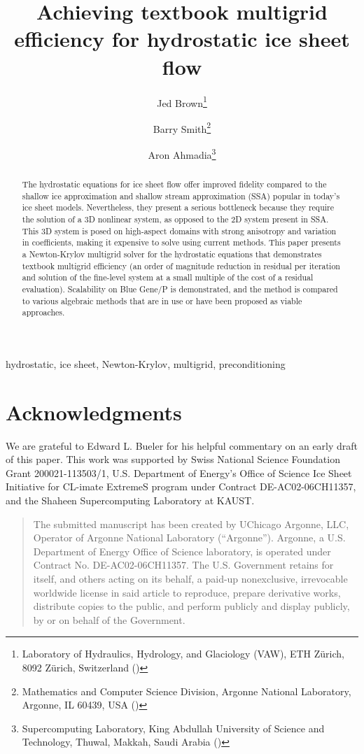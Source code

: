 \documentclass[final]{siamltex}
\title{Achieving textbook multigrid efficiency for hydrostatic ice sheet flow}
\author{%
  {Jed Brown}\thanks{Laboratory of Hydraulics, Hydrology, and Glaciology (VAW), ETH Z\"urich, 8092 Z\"urich, Switzerland (\email{brown@vaw.baug.ethz.ch})}
  \and {Barry Smith}\thanks{Mathematics and Computer Science Division, Argonne National Laboratory, Argonne, IL 60439, USA (\email{bsmith@mcs.anl.gov})}
  \and {Aron Ahmadia}\thanks{Supercomputing Laboratory, King Abdullah University of Science and Technology, Thuwal, Makkah, Saudi Arabia (\email{aron.ahmadia@kaust.edu.sa})}}
\begin{document}
\maketitle
\begin{abstract}
The hydrostatic equations for ice sheet flow offer improved fidelity compared to the shallow ice approximation and shallow stream approximation (SSA) popular in today's ice sheet models. Nevertheless, they present a serious bottleneck because they require the solution of a 3D nonlinear system, as opposed to the 2D system present in SSA.  This 3D system is posed on high-aspect domains with strong anisotropy and variation in coefficients, making it expensive to solve using current methods.  This paper presents a Newton-Krylov multigrid solver for the hydrostatic equations that demonstrates textbook multigrid efficiency (an order of magnitude reduction in residual per iteration and solution of the fine-level system at a small multiple of the cost of a residual evaluation).  Scalability on Blue Gene/P is demonstrated, and the method is compared to various algebraic methods that are in use or have been proposed as viable approaches.
\end{abstract}
\begin{keywords}
  hydrostatic, ice sheet, Newton-Krylov, multigrid, preconditioning
\end{keywords}
\pagestyle{myheadings}
\thispagestyle{plain}



\section*{Acknowledgments}
We are grateful to Edward L. Bueler for his helpful commentary on an early draft of this paper.
This work was supported by Swiss National Science Foundation Grant 200021-113503/1, U.S. Department of Energy's Office of Science Ice Sheet Initiative for CL-imate ExtremeS program under Contract DE-AC02-06CH11357, and the Shaheen Supercomputing Laboratory at KAUST.




\bigskip
\begin{quotation}
The submitted manuscript has been created by UChicago Argonne, LLC,
Operator of Argonne National Laboratory (``Argonne'').  Argonne, a
U.S. Department of Energy Office of Science laboratory, is operated
under Contract No. DE-AC02-06CH11357.  The U.S. Government retains for
itself, and others acting on its behalf, a paid-up nonexclusive,
irrevocable worldwide license in said article to reproduce, prepare
derivative works, distribute copies to the public, and perform
publicly and display publicly, by or on behalf of the Government.
\end{quotation}
\end{document}
